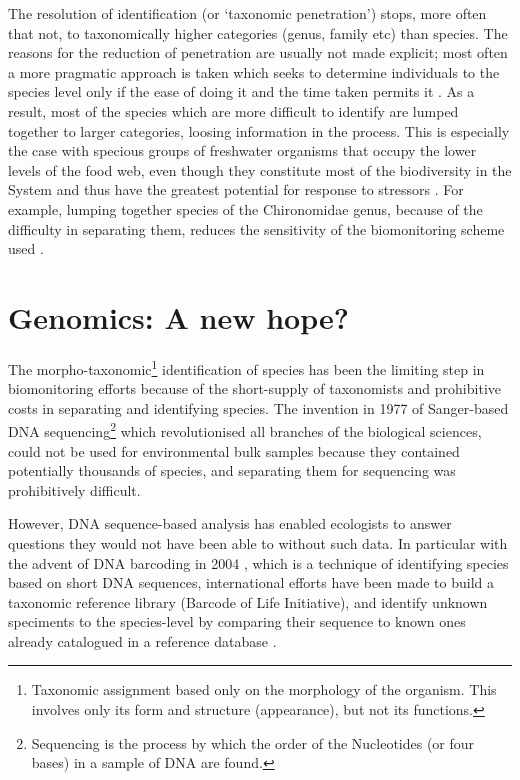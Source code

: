 The resolution of identification (or `taxonomic penetration') stops, more often that not, to taxonomically higher categories (genus, family etc) than species. The reasons for the reduction of penetration are usually not made explicit; most often a more pragmatic approach is taken which seeks to determine individuals to the species level only if the ease of doing it and the time taken permits it \cite{cranston_biomonitoring_1990}. As a result, most of the species which are more difficult to identify are lumped together to larger categories, loosing information in the process. This is especially the case with specious groups of freshwater organisms that occupy the lower levels of the food web, even though they constitute most of the biodiversity in the System and thus have the greatest potential for response to stressors \cite{woodward_biomonitoring_21st}. For example, lumping together species of the Chironomidae genus, because of the difficulty in separating them, reduces the sensitivity of the biomonitoring scheme used \cite{ruse_classification_2010}.



\section{Genomics: A new hope?}
The morpho-taxonomic\footnote{Taxonomic assignment based only on the morphology of the organism. This involves only its form and structure (appearance), but not its functions.} identification of species has been the limiting step in biomonitoring efforts because of the short-supply of taxonomists and prohibitive costs in separating and identifying species. The invention in 1977 of Sanger-based DNA sequencing\footnote{Sequencing is the process by which the order of the Nucleotides (or four bases) in a sample of DNA are found.} which revolutionised all branches of the biological sciences, could not be used for environmental bulk samples because they contained potentially thousands of species, and separating them for sequencing was prohibitively difficult. 

However, DNA sequence-based analysis has enabled ecologists to answer questions they would not have been able to without such data. In particular with the advent of DNA barcoding in 2004 \cite{hebert_paul_d._n._biological_2003}, which is a technique of identifying species based on short DNA sequences, international efforts have been made to build a taxonomic reference library (Barcode of Life Initiative), and identify unknown speciments to the species-level by comparing their sequence to known ones already catalogued in a reference database \cite{savolainen_vincent_towards_2005}. 

